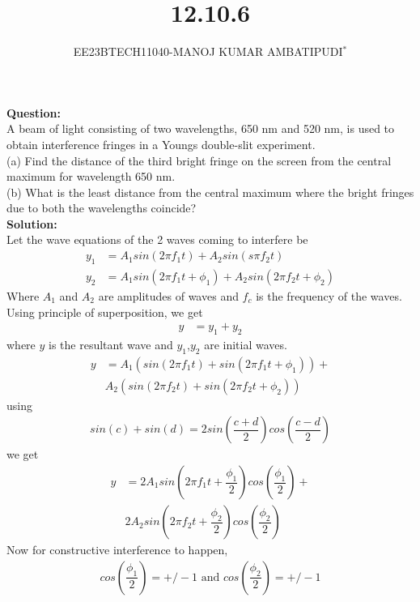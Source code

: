 \documentclass[journal,12pt,twocolumn]{IEEEtran}
\theoremstyle{remark}
\begin{document}

\vspace{3cm}
\title{\textbf{12.10.6}}
\author{EE23BTECH11040-MANOJ KUMAR AMBATIPUDI$^{*}$%
}
\maketitle
\newpage
\bigskip
\renewcommand{\thefigure}{\theenumi}
\renewcommand{\thetable}{\theenumi}
\textbf{Question:}
\\
A beam of light consisting of two wavelengths, 650 nm and 520 nm, is used to
obtain interference fringes in a Youngs double-slit experiment.\\
(a) Find the distance of the third bright fringe on the screen from
the central maximum for wavelength 650 nm.\\
(b) What is the least distance from the central maximum where the
bright fringes due to both the wavelengths coincide?
\\
\textbf{Solution:}
\\
Let the wave equations of the 2 waves coming to interfere be \begin{align}
    y_1 &= A_1sin(2\pi f_1t) + A_2sin(s\pi f_2t)\\
    y_2 &= A_1sin(2\pi f_1t +\phi_1)+A_2sin(2\pi f_2t + \phi_2)
\end{align}
Where $A_1$ and $A_2$ are amplitudes of waves and $f_c$ is the frequency of the waves. 
Using principle of superposition, we get 
\begin{align}
    y &= y_1+y_2 
\end{align}
where $y$ is the resultant wave and $y_1$,$y_2$ are initial waves.
\begin{align}
   y&=A_1(sin(2\pi f_1t)+sin(2\pi f_1t+\phi_1))+\\
   &A_2(sin(2\pi f_2t)+sin(2\pi f_2t+\phi_2))
\end{align}
using
\begin{align}
    sin(c)+sin(d)=2sin(\dfrac{c+d}{2})cos(\dfrac{c-d}{2})
\end{align}
we get
\begin{align}
    y&=2A_1sin(2\pi f_1t + \dfrac{\phi_1}{2})cos(\dfrac{\phi_1}{2})+\\&2A_2sin(2\pi f_2t + \dfrac{\phi_2}{2})cos(\dfrac{\phi_2}{2})
\end{align}
Now for constructive interference to happen,
\begin{align*}
    cos(\dfrac{\phi_1}{2})=+/-1 \text{ and } cos(\dfrac{\phi_2}{2})=+/-1 
\end{align*}
\end{document}
